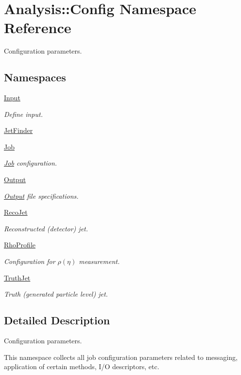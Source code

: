 \hypertarget{namespaceAnalysis_1_1Config}{}\section{Analysis\+:\+:Config Namespace Reference}
\label{namespaceAnalysis_1_1Config}


Configuration parameters.  


\subsection*{Namespaces}
\begin{DoxyCompactItemize}
\item 
 \hyperlink{namespaceAnalysis_1_1Config_1_1Input}{Input}
\begin{DoxyCompactList}\small\item\em Define input. \end{DoxyCompactList}\item 
 \hyperlink{namespaceAnalysis_1_1Config_1_1JetFinder}{Jet\+Finder}
\item 
 \hyperlink{namespaceAnalysis_1_1Config_1_1Job}{Job}
\begin{DoxyCompactList}\small\item\em \hyperlink{namespaceAnalysis_1_1Config_1_1Job}{Job} configuration. \end{DoxyCompactList}\item 
 \hyperlink{namespaceAnalysis_1_1Config_1_1Output}{Output}
\begin{DoxyCompactList}\small\item\em \hyperlink{namespaceAnalysis_1_1Config_1_1Output}{Output} file specifications. \end{DoxyCompactList}\item 
 \hyperlink{namespaceAnalysis_1_1Config_1_1RecoJet}{Reco\+Jet}
\begin{DoxyCompactList}\small\item\em Reconstructed (detector) jet. \end{DoxyCompactList}\item 
 \hyperlink{namespaceAnalysis_1_1Config_1_1RhoProfile}{Rho\+Profile}
\begin{DoxyCompactList}\small\item\em Configuration for $ \rho(\eta) $ measurement. \end{DoxyCompactList}\item 
 \hyperlink{namespaceAnalysis_1_1Config_1_1TruthJet}{Truth\+Jet}
\begin{DoxyCompactList}\small\item\em Truth (generated particle level) jet. \end{DoxyCompactList}\end{DoxyCompactItemize}


\subsection{Detailed Description}
Configuration parameters. 

This namespace collects all job configuration parameters related to messaging, application of certain methods, I/O descriptors, etc. 